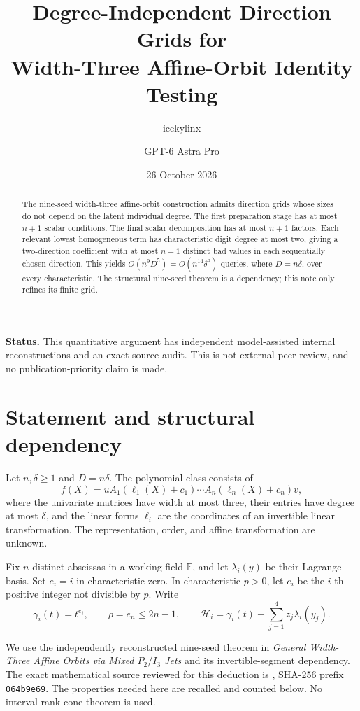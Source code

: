 \documentclass[11pt]{article}
\title{Degree-Independent Direction Grids for\\
Width-Three Affine-Orbit Identity Testing}
\author{icekylinx \and GPT-6 Astra Pro}\date{26 October 2026}
\newcommand{\F}{\mathbb F}
\begin{document}
\maketitle
\begin{abstract}
The nine-seed width-three affine-orbit construction admits direction
grids whose sizes do not depend on the latent individual degree.
The first preparation stage has at most \(n+1\) scalar conditions.
The final scalar decomposition has at most \(n+1\) factors.
Each relevant lowest homogeneous term has characteristic digit degree
at most two, giving a two-direction coefficient with at most \(n-1\)
distinct bad values in each sequentially chosen direction.
This yields \(O(n^9D^5)=O(n^{14}\delta^5)\) queries, where
\(D=n\delta\), over every characteristic. The structural nine-seed
theorem is a dependency; this note only refines its finite grid.
\end{abstract}

\noindent\textbf{Status.}
This quantitative argument has independent model-assisted internal
reconstructions and an exact-source audit. This is not external
peer review, and no publication-priority claim is made.

\section{Statement and structural dependency}

Let \(n,\delta\ge1\) and \(D=n\delta\).
The polynomial class consists of
\begin{equation}\label{eq:model}
 f(X)=u A_1(\ell_1(X)+c_1)\cdots A_n(\ell_n(X)+c_n)v,
\end{equation}
where the univariate matrices have width at most three, their entries
have degree at most \(\delta\), and the linear forms \(\ell_i\) are the
coordinates of an invertible linear transformation.
The representation, order, and affine transformation are unknown.

Fix \(n\) distinct abscissas in a working field \(\F\), and let
\(\lambda_i(y)\) be their Lagrange basis.
Set \(e_i=i\) in characteristic zero. In characteristic \(p>0\),
let \(e_i\) be the \(i\)-th positive integer not divisible by \(p\).
Write
\[
 \gamma_i(t)=t^{e_i},\qquad \rho=e_n\le2n-1,
 \qquad
 \mathcal H_i=\gamma_i(t)+\sum_{j=1}^4z_j\lambda_i(y_j).
\]

We use the independently reconstructed nine-seed theorem in
\emph{General Width-Three Affine Orbits via Mixed \(P_2/I_3\) Jets}
and its invertible-segment dependency.
The exact mathematical source reviewed for this deduction is
,
SHA-256 prefix \texttt{064b9e69}.
The properties needed here are recalled and counted below.
No interval-rank cone theorem is used.
\end{document}
